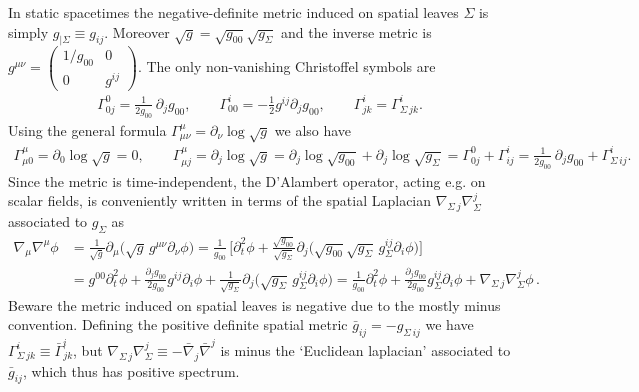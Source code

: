 \documentclass[../QFT_main.tex]{subfiles}
\begin{document}
\begin{mytheorem}
In static spacetimes the negative-definite metric induced on spatial leaves $\Sigma$ is simply $g_{|\Sigma}\equiv g_{ij}$.
Moreover $\sqrt{g}=\sqrt{g_{00}}\sqrt{g_\Sigma}$ and the inverse metric is {\small$g^{\mu\nu}=\begin{pmatrix}1/g_{00} & 0\\0 & g^{ij}\end{pmatrix}$}.
The only non-vanishing Christoffel symbols are
{\small\begin{align}
    \Gamma^0_{0j} = \frac{1}{2g_{00}}\,\partial_j g_{00},
    \qquad
    \Gamma^i_{00} = -\frac12 g^{ij}\partial_j g_{00},
    \qquad
    \Gamma^i_{jk}=\Gamma^i_{\!\!\Sigma\,jk}.
\end{align}}
Using the general formula $\Gamma^\mu_{\mu\nu}=\partial_\nu \log\sqrt{g}$ we also have
{\small\begin{align}
    \Gamma^\mu_{\mu 0}=\partial_0\log\sqrt{g}=0,
    \qquad
    \Gamma^\mu_{\mu j}=\partial_j\log\sqrt{g}=\partial_j\log\sqrt{g_{00}}+\partial_j\log\sqrt{g_\Sigma}=\Gamma^0_{0j}+\Gamma^i_{ij}
    =\frac{1}{2g_{00}}\,\partial_j g_{00}+\Gamma^i_{\!\!\Sigma\, ij}.
\end{align}}
Since the metric is time-independent, the D'Alambert operator, acting e.g. on scalar fields, is conveniently written in terms of the spatial Laplacian ${\nabla}_{\!\!\Sigma\,j}{\nabla}^j_{\!\!\Sigma}$ associated to $g_\Sigma$ as
{\small\begin{align}
  \nabla_\mu\nabla^\mu \phi &=\tfrac{1}{\sqrt{g}}\partial_\mu\Big(\sqrt{g}\,g^{\mu\nu}\partial_\nu\phi\Big)= \frac{1}{g_{00}}\,\Big[\partial_t^2\phi+ \tfrac{\sqrt{g_{00}}}{\sqrt{g_\Sigma}}\partial_j\Big(\sqrt{g_{00}}\sqrt{g_\Sigma}\,g_\Sigma^{ij}\partial_i\phi\Big)\Big]\\
  &= g^{00} \partial_t^2 \phi +\tfrac{\partial_jg_{00}}{2g_{00}} g^{ij} \partial_i \phi +\tfrac{1}{\sqrt{g_\Sigma}}\partial_j\Big(\sqrt{g_\Sigma}\, g_\Sigma^{ij}\partial_i \phi\Big)=\tfrac{1}{g_{00}} \partial_t^2 \phi + \tfrac{\partial_jg_{00}}{2g_{00}} g^{ij}_\Sigma \partial_i \phi +{\nabla}_{\!\!\Sigma\,j}{\nabla}^j_{\!\!\Sigma}\phi\,.
\end{align}}
Beware the metric induced on spatial leaves is negative due to the mostly minus convention.
Defining the positive definite spatial metric $\bar{g}_{ij}=-g_{\Sigma\,ij}$ we have $\Gamma^i_{\!\!\Sigma\, jk}\equiv \bar{\Gamma}_{jk}^i$, but ${\nabla}_{\!\!\Sigma\,j}{\nabla}^j_{\!\!\Sigma}\equiv - \bar{\nabla}_j \bar{\nabla}^j$ is minus the `Euclidean laplacian' associated to $\bar{g}_{ij}$, which thus has positive spectrum.

\end{mytheorem}
\end{document}
